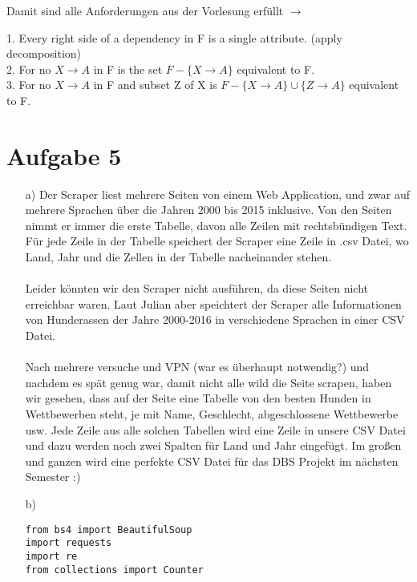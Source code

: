 Damit sind alle Anforderungen aus der Vorlesung erfüllt $\rightarrow$ 

1. Every right side of a dependency in F is a single attribute.
(apply decomposition) \\
2. For no $ X \rightarrow A $ in F is the set $F - \{ X \rightarrow A \}$
equivalent to F. \\
3. For no $ X \rightarrow A $ in F and subset Z of X is
$F - \{ X \rightarrow A \} \cup \{ Z \rightarrow A \}$ equivalent to F.

\section*{Aufgabe 5}

\begin{enumerate}

\item[a)]
Der Scraper liest mehrere Seiten von einem Web Application, und zwar auf mehrere Sprachen über die Jahren 2000 bis 2015 inklusive.
Von den Seiten nimmt er immer die erste Tabelle, davon alle Zeilen mit rechtsbündigen Text. Für jede Zeile in der Tabelle speichert 
der Scraper eine Zeile in .csv Datei, wo Land, Jahr und die Zellen in der Tabelle nacheinander stehen. \\ \\

Leider könnten wir den Scraper nicht ausführen, da diese Seiten nicht erreichbar waren. Laut Julian aber speichtert der Scraper
alle Informationen von Hunderassen der Jahre 2000-2016 in verschiedene Sprachen in einer CSV Datei. \\ \\

Nach mehrere versuche und VPN (war es überhaupt notwendig?) und nachdem es spät genug war, damit nicht alle wild die Seite scrapen, 
haben wir gesehen, dass auf der Seite eine Tabelle von den besten Hunden in Wettbewerben steht, je mit Name, Geschlecht, abgeschlossene Wettbewerbe usw.
Jede Zeile aus alle solchen Tabellen wird eine Zeile in unsere CSV Datei und dazu werden noch zwei Spalten für Land und Jahr eingefügt. Im großen und ganzen
wird eine perfekte CSV Datei für das DBS Projekt im nächsten Semester :)

\item[b)]

\begin{lstlisting}[style=py]
from bs4 import BeautifulSoup
import requests
import re
from collections import Counter


\end{lstlisting}
\end{enumerate}

